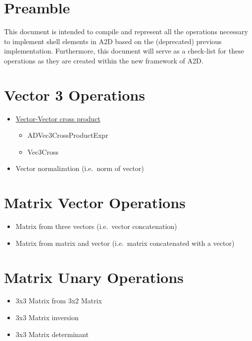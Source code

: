 \documentclass[11pt]{article}
\begin{document}
\section{Preamble}\label{sec:preamble}
    This document is intended to compile and represent all the operations necessary to implement shell elements in A2D based on the (deprecated) previous implementation.
    Furthermore, this document will serve as a check-list for these operations as they are created within the new framework of A2D\@.


\section{Vector 3 Operations}\label{sec:vector-3-operations}
    \begin{itemize}
        \item \href{../include/a2dvecops3d.h}{Vector-Vector cross product}
        \begin{itemize}
            \item ADVec3CrossProductExpr
            \item Vec3Cross
        \end{itemize}
        \item Vector normalization (i.e.\ norm of vector)
    \end{itemize}

\section{Matrix Vector Operations}\label{sec:matrix-vector-operations}
    \begin{itemize}
        \item Matrix from three vectors (i.e.\ vector concatenation)
        \item Matrix from matrix and vector (i.e.\ matrix concatenated with a vector)
    \end{itemize}

\section{Matrix Unary Operations}\label{sec:matrix-unary-operations}
    \begin{itemize}
        \item 3x3 Matrix from 3x2 Matrix
        \item 3x3 Matrix inversion
        \item 3x3 Matrix determinant
    \end{itemize}
\end{document}
